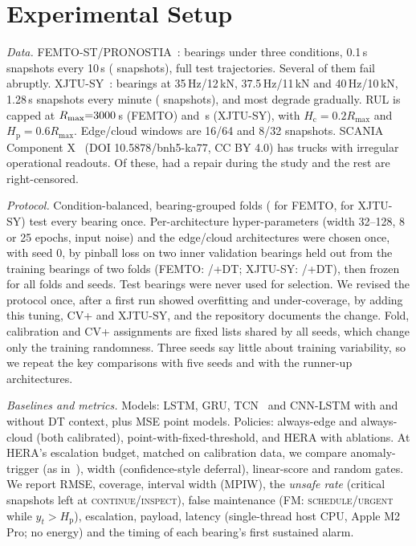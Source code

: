 \documentclass[conference]{IEEEtran}
\newcommand{\Hc}{H_{\mathrm{c}}}
\newcommand{\Hp}{H_{\mathrm{p}}}
\begin{document}
\section{Experimental Setup}
\textit{Data.} FEMTO-ST/PRONOSTIA~\cite{nectoux2012pronostia}: \feNBearings{} bearings under three conditions, 0.1\,s snapshots every 10\,s (\feNSnap{} snapshots), full test trajectories. Several of them fail abruptly. XJTU-SY~\cite{wang2020xjtu}: \xjNBearings{} bearings at 35\,Hz/12\,kN, 37.5\,Hz/11\,kN and 40\,Hz/10\,kN, 1.28\,s snapshots every minute (\xjNSnap{} snapshots), and most degrade gradually. RUL is capped at $R_{\max}{=}3000$\,s (FEMTO) and \xjRmax\,s (XJTU-SY), with $\Hc{=}0.2R_{\max}$ and $\Hp{=}0.6R_{\max}$. Edge/cloud windows are 16/64 and 8/32 snapshots. SCANIA Component X~\cite{kharazian2025scania} (DOI 10.5878/bnh5-ka77, CC BY 4.0) has \flN{} trucks with irregular operational readouts. Of these, \flNf{} had a repair during the study and the rest are right-censored.

\textit{Protocol.} Condition-balanced, bearing-grouped folds (\feNFolds{} for FEMTO, \xjNFolds{} for XJTU-SY) test every bearing once. Per-architecture hyper-parameters (width 32--128, 8 or 25 epochs, input noise) and the edge/cloud architectures were chosen once, with seed 0, by pinball loss on two inner validation bearings held out from the training bearings of two folds (FEMTO: \feEdgeModel/\feCloudModel+DT; XJTU-SY: \xjEdgeModel/\xjCloudModel+DT), then frozen for all folds and seeds. Test bearings were never used for selection. We revised the protocol once, after a first run showed overfitting and under-coverage, by adding this tuning, CV+ and XJTU-SY, and the repository documents the change. Fold, calibration and CV+ assignments are fixed lists shared by all seeds, which change only the training randomness. Three seeds say little about training variability, so we repeat the key comparisons with five seeds and with the runner-up architectures.

\textit{Baselines and metrics.} Models: LSTM, GRU, TCN~\cite{bai2018tcn} and CNN-LSTM with and without DT context, plus MSE point models. Policies: always-edge and always-cloud (both calibrated), point-with-fixed-threshold, and HERA with ablations. At HERA's escalation budget, matched on calibration data, we compare anomaly-trigger (as in~\cite{saleh2026hama}), width (confidence-style deferral), linear-score and random gates. We report RMSE, coverage, interval width (MPIW), the \emph{unsafe rate} (critical snapshots left at \textsc{continue}/\textsc{inspect}), false maintenance (FM: \textsc{schedule}/\textsc{urgent} while $y_t>\Hp$), escalation, payload, latency (single-thread host CPU, Apple M2 Pro; no energy) and the timing of each bearing's first sustained alarm.
\end{document}

